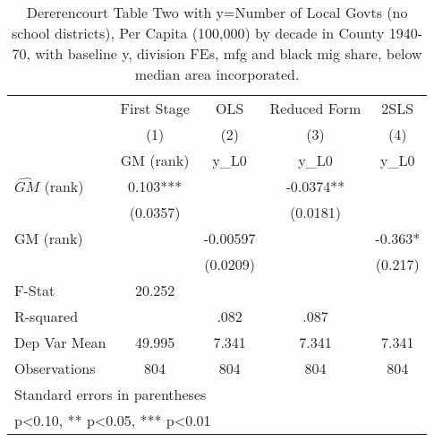 \begin{table}[htbp]\centering
\def\sym#1{\ifmmode^{#1}\else\(^{#1}\)\fi}
\caption{Dererencourt Table Two with y=Number of Local Govts (no school districts), Per Capita (100,000) by decade in County 1940-70, with baseline y, division FEs, mfg and black mig share, below median area incorporated.}
\begin{tabular}{l*{4}{c}}
\toprule
                    & First Stage   &         OLS   &Reduced Form   &        2SLS   \\
                    &\multicolumn{1}{c}{(1)}&\multicolumn{1}{c}{(2)}&\multicolumn{1}{c}{(3)}&\multicolumn{1}{c}{(4)}\\
                    &\multicolumn{1}{c}{GM  (rank)}&\multicolumn{1}{c}{y\_L0}&\multicolumn{1}{c}{y\_L0}&\multicolumn{1}{c}{y\_L0}\\
\midrule
$\hat{GM}$ (rank)   &       0.103***&               &     -0.0374** &               \\
                    &    (0.0357)   &               &    (0.0181)   &               \\
\addlinespace
GM  (rank)          &               &    -0.00597   &               &      -0.363*  \\
                    &               &    (0.0209)   &               &     (0.217)   \\
\midrule
F-Stat              &      20.252   &               &               &               \\
R-squared           &               &        .082   &        .087   &               \\
Dep Var Mean        &      49.995   &       7.341   &       7.341   &       7.341   \\
Observations        &         804   &         804   &         804   &         804   \\
\bottomrule
\multicolumn{5}{l}{\footnotesize Standard errors in parentheses}\\
\multicolumn{5}{l}{\footnotesize * p<0.10, ** p<0.05, *** p<0.01}\\
\end{tabular}
\end{table}

